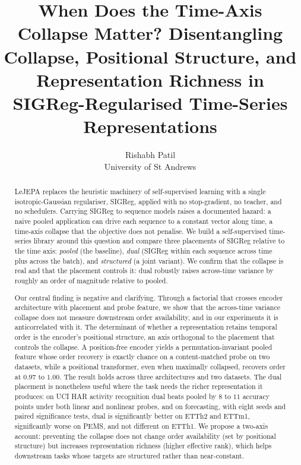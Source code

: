 \documentclass[11pt]{article}
\title{When Does the Time-Axis Collapse Matter? Disentangling Collapse,
Positional Structure, and Representation Richness in SIGReg-Regularised
Time-Series Representations}
\author{Rishabh Patil \\ University of St Andrews}
\date{}
\begin{document}
\maketitle

\begin{abstract}
LeJEPA \citep{lejepa2025} replaces the heuristic machinery of self-supervised learning with a
single isotropic-Gaussian regulariser, SIGReg, applied with no stop-gradient, no teacher, and no
schedulers. Carrying SIGReg to sequence models raises a documented hazard: a naive pooled
application can drive each sequence to a constant vector along time, a time-axis collapse that the
objective does not penalise. We build a self-supervised time-series library around this question
and compare three placements of SIGReg relative to the time axis: \emph{pooled} (the baseline),
\emph{dual} (SIGReg within each sequence across time plus across the batch), and \emph{structured}
(a joint variant). We confirm that the collapse is real and that the placement controls it: dual
robustly raises across-time variance by roughly an order of magnitude relative to pooled.

Our central finding is negative and clarifying. Through a factorial that crosses encoder
architecture with placement and probe feature, we show that the across-time variance collapse does
not measure downstream order availability, and in our experiments it is anticorrelated with it. The
determinant of whether a representation retains temporal order is the encoder's positional
structure, an axis orthogonal to the placement that controls the collapse. A position-free encoder
yields a permutation-invariant pooled feature whose order recovery is exactly chance on a
content-matched probe on two datasets, while a positional transformer, even when maximally
collapsed, recovers order at $0.97$ to $1.00$. The result holds across three architectures and two
datasets. The dual placement is nonetheless useful where the task needs the richer representation
it produces: on UCI HAR activity recognition dual beats pooled by $8$ to $11$ accuracy points under
both linear and nonlinear probes, and on forecasting, with eight seeds and paired significance
tests, dual is significantly better on ETTh2 and ETTm1, significantly worse on PEMS, and not
different on ETTh1. We propose a two-axis account: preventing the collapse does not change order
availability (set by positional structure) but increases representation richness (higher effective
rank), which helps downstream tasks whose targets are structured rather than near-constant.
\end{abstract}
\end{document}
